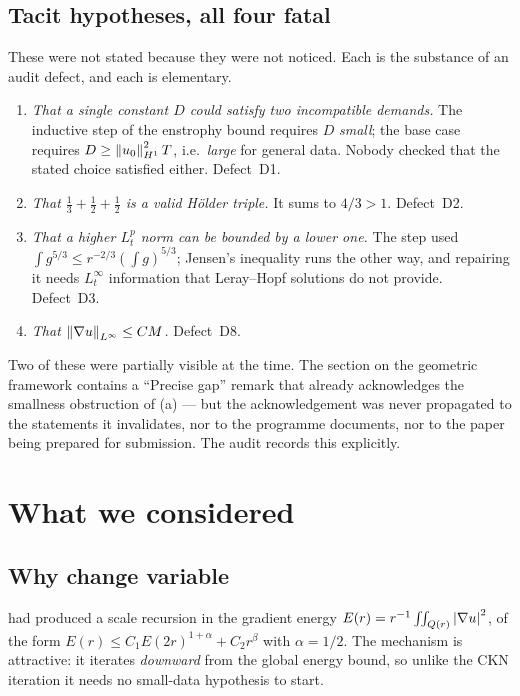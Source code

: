 \subsection{Tacit hypotheses, all four fatal}

These were not stated because they were not noticed. Each is the substance of
an audit defect, and each is elementary.

\begin{enumerate}[leftmargin=2.2em, label=(\alph*)]
\item \emph{That a single constant \(D\) could satisfy two incompatible
  demands.} The inductive step of the enstrophy bound requires \(D\)
  \emph{small}; the base case requires \(D\ge\left\|u_0\right\|_{H^1}^2T\), i.e.\
  \emph{large} for general data. Nobody checked that the stated choice
  satisfied either. Defect~D1.
\item \emph{That \(\tfrac13+\tfrac12+\tfrac12\) is a valid H\"older triple.}
  It sums to \(4/3>1\). Defect~D2.
\item \emph{That a higher \(L^p_t\) norm can be bounded by a lower one.} The
  step used \(\int g^{5/3}\le r^{-2/3}(\int g)^{5/3}\); Jensen's inequality
  runs the other way, and repairing it needs \(L^\infty_t\) information that
  Leray--Hopf solutions do not provide. Defect~D3.
\item \emph{That \(\left\|\nabla u\right\|_{L^\infty}\le CM\).} Defect~D8.
\end{enumerate}

Two of these were partially visible at the time. The  section on the
geometric framework contains a ``Precise gap'' remark that already
acknowledges the smallness obstruction of (a) --- but the acknowledgement was
never propagated to the statements it invalidates, nor to the programme
documents, nor to the paper being prepared for submission. The audit records
this explicitly.

\section{What we considered}
\label{sec:prize-considered}

\subsection{Why change variable}

 had produced a scale recursion in the gradient energy
\(E(r)=r^{-1}\iint_{Q(r)}\left|\nabla u\right|^2\), of the form
\(E(r)\le C_1E(2r)^{1+\alpha}+C_2r^\beta\) with \(\alpha=1/2\). The mechanism
is attractive: it iterates \emph{downward} from the global energy bound, so
unlike the CKN iteration it needs no small-data hypothesis to start.

